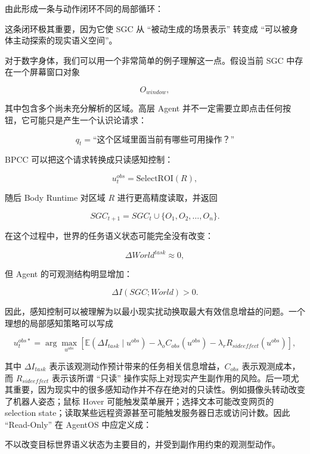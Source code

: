 由此形成一条与动作闭环不同的局部循环：

\begin{statementbox}
\centering
{}
\end{statementbox}

这条闭环极其重要，因为它使 SGC 从 ``被动生成的场景表示'' 转变成 ``可以被身体主动探索的现实语义空间''。

对于数字身体，我们可以用一个非常简单的例子理解这一点。假设当前 SGC 中存在一个屏幕窗口对象

\[
O_{window},
\]

其中包含多个尚未充分解析的区域。高层 Agent 并不一定需要立即点击任何按钮，它可能只是产生一个认识论请求：

\[
q_t=
\text{``这个区域里面当前有哪些可用操作？''}
\]

BPCC 可以把这个请求转换成只读感知控制：

\[
u_t^{obs}
=
\text{SelectROI}(R),
\]

随后 Body Runtime 对区域 $R$ 进行更高精度读取，并返回

\[
SGC_{t+1}
=
SGC_t
\cup
\{
O_1,O_2,\ldots,O_n
\}.
\]

在这个过程中，世界的任务语义状态可能完全没有改变：

\[
\Delta World^{task}
\approx0,
\]

但 Agent 的可观测结构明显增加：

\[
\Delta I(SGC;World)>0.
\]

因此，感知控制可以被理解为以最小现实扰动换取最大有效信息增益的问题。一个理想的局部感知策略可以写成

\[
u_{t}^{obs*}
=
\arg\max_{u^{obs}}
\left[
\mathbb E
\left(
\Delta I_{task}
\mid
u^{obs}
\right)
-
\lambda_o C_{obs}(u^{obs})
-
\lambda_r R_{sideeffect}(u^{obs})
\right],
\]

其中 $\Delta I_{task}$ 表示该观测动作预计带来的任务相关信息增益，$C_{obs}$ 表示观测成本，而 $R_{sideeffect}$ 表示该所谓 ``只读'' 操作实际上对现实产生副作用的风险。后一项尤其重要，因为现实中的很多感知动作并不存在绝对的只读性。例如摄像头转动改变了机器人姿态；鼠标 Hover 可能触发菜单展开；选择文本可能改变网页的 selection state；读取某些远程资源甚至可能触发服务器日志或访问计数。因此 ``Read-Only'' 在 AgentOS 中应定义成：

\begin{definition*}
不以改变目标世界语义状态为主要目的，并受到副作用约束的观测型动作。
\end{definition*}

